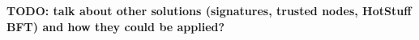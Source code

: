 
\textbf{TODO: talk about other solutions (signatures, trusted nodes, HotStuff BFT) and how they could be applied?
}